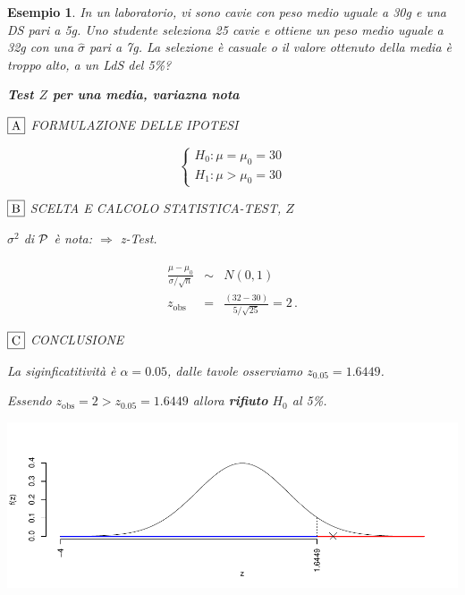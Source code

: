 \documentclass[
  11pt,
]{book}
\theoremstyle{mytheoremstyle}
\theoremstyle{mydefstyle}
\newtheorem{example}{{Esempio}}[section]
\begin{document}
\begin{example}

In un laboratorio, vi sono cavie con peso medio uguale a 30g e una DS
pari a 5g. Uno studente seleziona 25 cavie e ottiene un peso medio
uguale a 32g con una \(\hat\sigma\) pari a 7g. La selezione è casuale o il
valore ottenuto della media è troppo alto, a un LdS del 5\%?

\textbf{Test \(Z\) per una media, variazna nota}

\(\fbox{A}\) FORMULAZIONE DELLE IPOTESI

\[\begin{cases}
   H_0: \mu = \mu_0=30 \\
   H_1: \mu > \mu_0=30 
   \end{cases}\]

\(\fbox{B}\) SCELTA E CALCOLO STATISTICA-TEST, \(Z\)

\(\sigma^{2}\) di \(\cal{P}\) è nota: \(\Rightarrow\) z-Test.

\begin{eqnarray*}
   \frac{\hat\mu - \mu_{0}} {\sigma/\sqrt{n}}&\sim&N(0,1)\\
   z_{\text{obs}}
   &=& \frac{ ( 32 -  30 )} { 5 /\sqrt{ 25 }}
   =   2 \, .
   \end{eqnarray*}

\(\fbox{C}\) CONCLUSIONE

La siginficatitività è \(\alpha=0.05\), dalle tavole osserviamo \(z_{0.05}=1.6449\).

Essendo \(z_\text{obs}=2>z_{0.05}=1.6449\) allora \textbf{rifiuto} \(H_0\) al 5\%.

\begin{center}\includegraphics{Appunti_di_Statistica_2025_files/figure-latex/15-test-mu-pi-1-1} \end{center}

\end{example}
\end{document}
